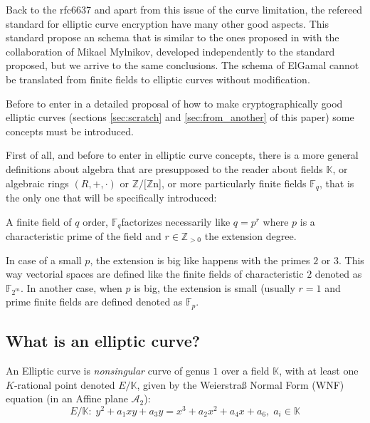 \documentclass[10pt,a4paper,twoside]{llncs}
\newcommand{\A}{\ensuremath{\mathcal{A}_{2}}}%
\newcommand{\K}{\ensuremath{\mathbb{K}}}%
\newcommand{\Fp}{\ensuremath{\mathbb{F}_p}}%
\newcommand{\Fm}{\ensuremath{\mathbb{F}_{2^m}}}%
\newcommand{\Fq}{\ensuremath{\mathbb{F}_q}}%
\newcommand{\Zn}[1]{\ensuremath{\mathbb{Z}/#1\mathbb{Z}}}%
\begin{document}
Back to the rfc6637 \cite{rfc6637} and apart from this issue of the curve limitation, the refereed standard for elliptic curve encryption have many other good aspects. This standard propose an schema that is similar to the ones proposed in \cite{BM06} with the collaboration of Mikael Mylnikov, developed independently to the standard proposed, but we arrive to the same conclusions. The schema of ElGamal cannot be translated from finite fields to elliptic curves without modification.

Before to enter in a detailed proposal of how to make cryptographically good elliptic curves (sections \ref{sec:scratch} and \ref{sec:from_another} of this paper) some concepts must be introduced. 

First of all, and before to enter in elliptic curve concepts, there is a more general definitions about algebra that are presupposed to the reader about fields \K, or algebraic rings $(R,+,\cdot)$ or \Zn[n], or more particularly finite fields \Fq, that is the only one that will be specifically introduced:

\begin{definition}\label{def:cf}
 A finite field of $q$ order, \Fq \;factorizes necessarily like $q=p^r$ where $p$ is a characteristic prime of the field and $r \in \mathbb{Z}_{>0}$ the extension degree.
\end{definition}

In case of a small $p$, the extension is big like happens with the primes $2$ or $3$. This way vectorial spaces are defined like the finite fields of characteristic $2$ denoted as \Fm. In another case, when $p$ is big, the extension is small (usually $r=1$ and prime finite fields are defined denoted as \Fp.

\subsection{What is an elliptic curve? \label{sec:ce}}


\begin{definition}\label{def:ce}
An Elliptic curve is \emph{nonsingular} curve of genus $1$ over a field $\mathbb{K}$, with at least one $K$-rational point denoted $E/\mathbb{K}$, given by the Weierstra\ss{} Normal Form (WNF) equation (in an Affine plane \A):
\begin{equation}\label{eq:WNF}
E/\mathbb{K}:\; y^{2} + a_{1}xy + a_{3}y = x^{3} + a_{2}x^{2} + a_{4}x + a_{6},\; a_{i} \in \mathbb{K}
\end{equation}
\end{definition}
\end{document}
